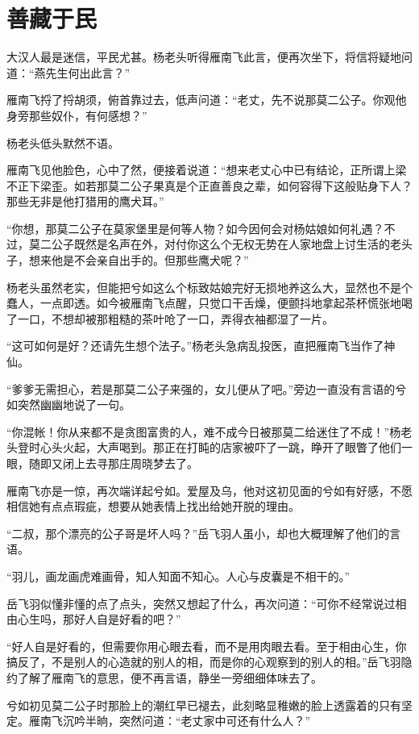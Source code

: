 

\chapter{善藏于民}
\label{chap:cang-shan-yu-min}

大汉人最是迷信，平民尤甚。杨老头听得雁南飞此言，便再次坐下，将信将疑地问道：“燕先生何出此言？”

雁南飞捋了捋胡须，俯首靠过去，低声问道：“老丈，先不说那莫二公子。你观他身旁那些奴仆，有何感想？”

杨老头低头默然不语。

雁南飞见他脸色，心中了然，便接着说道：“想来老丈心中已有结论，正所谓上梁不正下梁歪。如若那莫二公子果真是个正直善良之辈，如何容得下这般贴身下人？那些无非是他打猎用的鹰犬耳。”

“你想，那莫二公子在莫家堡里是何等人物？如今因何会对杨姑娘如何礼遇？不过，莫二公子既然是名声在外，对付你这么个无权无势在人家地盘上讨生活的老头子，想来他是不会亲自出手的。但那些鹰犬呢？”

杨老头虽然老实，但能把兮如这么个标致姑娘完好无损地养这么大，显然也不是个蠢人，一点即透。如今被雁南飞点醒，只觉口干舌燥，便颤抖地拿起茶杯慌张地喝了一口，不想却被那粗糙的茶叶呛了一口，弄得衣袖都湿了一片。

“这可如何是好？还请先生想个法子。”杨老头急病乱投医，直把雁南飞当作了神仙。

“爹爹无需担心，若是那莫二公子来强的，女儿便从了吧。”旁边一直没有言语的兮如突然幽幽地说了一句。

“你混帐！你从来都不是贪图富贵的人，难不成今日被那莫二给迷住了不成！”杨老头登时心头火起，大声喝到。那正在打盹的店家被吓了一跳，睁开了眼瞥了他们一眼，随即又闭上去寻那庄周晓梦去了。

雁南飞亦是一惊，再次端详起兮如。爱屋及乌，他对这初见面的兮如有好感，不愿相信她有点点瑕疵，想要从她表情上找出给她开脱的理由。

“二叔，那个漂亮的公子哥是坏人吗？”岳飞羽人虽小，却也大概理解了他们的言语。

“羽儿，画龙画虎难画骨，知人知面不知心。人心与皮囊是不相干的。”

岳飞羽似懂非懂的点了点头，突然又想起了什么，再次问道：“可你不经常说过相由心生吗，那好人自是好看的吧？”

“好人自是好看的，但需要你用心眼去看，而不是用肉眼去看。至于相由心生，你搞反了，不是别人的心造就的别人的相，而是你的心观察到的别人的相。”岳飞羽隐约了解了雁南飞的意思，便不再言语，静坐一旁细细体味去了。

兮如初见莫二公子时那脸上的潮红早已褪去，此刻略显稚嫩的脸上透露着的只有坚定。雁南飞沉吟半晌，突然问道：“老丈家中可还有什么人？”